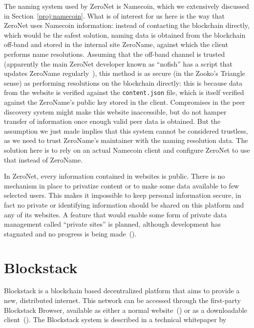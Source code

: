 \documentclass[mscthesis]{usiinfthesis}
\begin{document}
The naming system used by ZeroNet is Namecoin, which we extensively discussed in Section~\ref{proj:namecoin}. What is of interest for us here is the way that ZeroNet uses Namecoin information: instead of contacting the blockchain directly, which would be the safest solution, naming data is obtained from the blockchain off-band and stored in the internal site ZeroName, against which the client performs name resolutions. Assuming that the off-band channel is trusted (apparently the main ZeroNet developer known as ``nofish'' has a script that updates ZeroName regularly~\cite{website:zeronameupdate}), this method is as secure (in the Zooko's Triangle sense) as performing resolutions on the blockchain directly: this is because data from the website is verified against the \texttt{content.json} file, which is itself verified against the ZeroName's public key stored in the client. Compromises in the peer discovery system might make this website inaccessible, but do not hamper transfer of information once enough valid peer data is obtained. But the assumption we just made implies that this system cannot be considered trustless, as we need to trust ZeroName's maintainer with the naming resolution data. The solution here is to rely on an actual Namecoin client and configure ZeroNet to use that instead of ZeroName.

In ZeroNet, every information contained in websites is public. There is no mechanism in place to privatize content or to make some data available to few selected users. This makes it impossible to keep personal information secure, in fact no private or identifying information should be shared on this platform and any of its websites. 
A feature that would enable some form of private data management called ``private sites'' is planned, although development has stagnated and no progress is being made~(\cite{website:zeronetprivatesites}).

\section{Blockstack}\label{proj:blockstack}

Blockstack is a blockchain based decentralized platform that aims to provide a new, distributed internet. This network can be accessed through the first-party Blockstack Browser, available as either a normal website~(\cite{website:blockstackbrowser}) or as a downloadable client~(\cite{website:blockstackdownload}). The Blockstack system is described in a technical whitepaper by~\cite{blockstack} %
\end{document}
